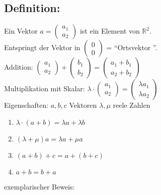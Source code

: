 %
%
%
\subsection{Definition:}
Ein Vektor $a= \begin{pmatrix} a_{1}\\  a_{2} \end{pmatrix}$ ist ein Element von $\mathbb{R}^{2}$.\\
Entspringt der Vektor in $\begin{pmatrix} 0 \\ 0 \end{pmatrix}$ = "`Ortsvektor "'.\\
%
%
%
%
Addition: $\begin{pmatrix}a_{1} \\ a_{2} \end{pmatrix} + \begin{pmatrix} b_{1} \\ b_{2} \end{pmatrix} = \begin{pmatrix} a_{1}+b_{1} \\ a_{2}+b_{2} \end{pmatrix} $\\
Multiplikation mit Skalar: $\lambda \cdot \begin{pmatrix} a_{1} \\ a_{2} \end{pmatrix} = \begin{pmatrix} \lambda a_{1} \\ \lambda a_{2} \end{pmatrix}$\\
Eigenschaften: $a,b,c$ Vektoren $\lambda, \mu $ reele Zahlen
\begin{enumerate}
\item $\lambda \cdot (a+b) = \lambda a + \lambda b$
\item $(\lambda + \mu) a = \lambda a + \mu a$
\item $(a+b)+c=a+(b+c)$
\item $a+b = b+a$
\end{enumerate}
exemplarischer Beweis:\\
